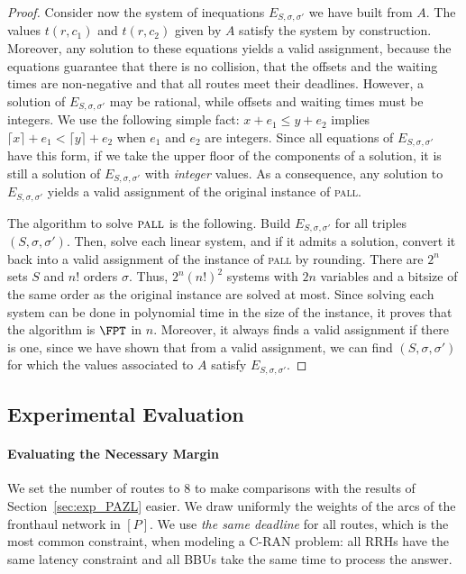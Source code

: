 \documentclass[a4paper,10pt]{article}
\newcommand\pall{\textsc{pall}\xspace}
\begin{document}
\begin{proof}
Consider now the system of inequations $E_{S,\sigma,\sigma'}$ we have built from $A$.
The values $t(r,c_1)$ and $t(r,c_2)$ given by $A$ satisfy the system by construction. 
Moreover, any solution to these equations yields a valid assignment, because the equations guarantee 
that there is no collision, that the offsets and the waiting times are non-negative and that all routes meet their deadlines. However, a solution of $E_{S,\sigma,\sigma'}$ may be rational, while offsets and waiting times must be integers. We use the following simple fact: $x + e_1 \leq y + e_2$ implies $\lceil x \rceil + e_1 < \lceil y \rceil + e_2$ when $e_1$ and $e_2$ are integers. Since all equations of $E_{S,\sigma,\sigma'}$ have this form, if we take the upper floor of the components of a solution, it is still a solution of $E_{S,\sigma,\sigma'}$ with \emph{integer} values. As a consequence, any solution to $E_{S,\sigma,\sigma'}$ yields a valid assignment of the original instance of \pall.

The algorithm to solve $\pall$ is the following. Build $E_{S,\sigma,\sigma'}$ for all triples $(S,\sigma,\sigma')$. Then, solve each linear system, and if it admits a solution, convert it back into a
valid assignment of the instance of \pall by rounding. There are $2^n$ sets $S$ and $n!$ orders $\sigma$. Thus, $2^n(n!)^2$ systems with $2n$ variables and a bitsize of the same order as the original instance are solved at most. Since solving each system can be done in polynomial time in the size of the instance, it proves that the algorithm is $\FPT$ in $n$. Moreover, it always finds a valid assignment if there is one, since we have shown that from a valid assignment, we can find $(S,\sigma,\sigma')$ for which the values associated to $A$ satisfy $E_{S,\sigma,\sigma'}$.

\end{proof}


    \subsection{Experimental Evaluation}
    \label{sec:resultsPALL}
    \paragraph{Evaluating the Necessary Margin}
    

    We set the number of routes to $8$ to make comparisons with the results of Section~\ref{sec:exp_PAZL} easier. We draw uniformly the weights of the arcs of the fronthaul network in $[P]$. We use \emph{the same deadline} for all routes, which is the most common constraint, when modeling a C-RAN problem: all RRHs have the same latency constraint and all BBUs take the same time to process the answer. 
\end{document}
